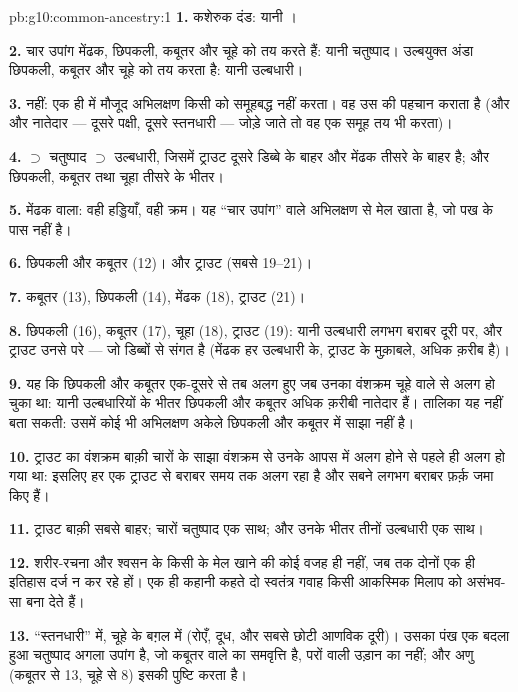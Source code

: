 \begin{solution}{pb:g10:common-ancestry:1}
\textbf{1.} कशेरुक दंड: यानी ।

\textbf{2.} चार उपांग मेंढक, छिपकली, कबूतर और चूहे को तय करते हैं: यानी
चतुष्पाद। उल्बयुक्त अंडा छिपकली, कबूतर और चूहे को तय करता है: यानी
उल्बधारी।

\textbf{3.} नहीं: एक ही  में मौजूद अभिलक्षण किसी को समूहबद्ध नहीं
करता। वह उस  की पहचान कराता है (और और नातेदार --- दूसरे पक्षी,
दूसरे स्तनधारी --- जोड़े जाते तो वह एक समूह तय भी करता)।

\textbf{4.}  $\supset$ चतुष्पाद $\supset$ उल्बधारी, जिसमें ट्राउट
दूसरे डिब्बे के बाहर और मेंढक तीसरे के बाहर है; और छिपकली, कबूतर तथा चूहा
तीसरे के भीतर।

\textbf{5.} मेंढक वाला: वही हड्डियाँ, वही क्रम। यह
``चार उपांग'' वाले अभिलक्षण से मेल खाता है, जो पख के पास नहीं है।

\textbf{6.} छिपकली और कबूतर (12)। और ट्राउट (सबसे 19--21)।

\textbf{7.} कबूतर (13), छिपकली (14), मेंढक (18), ट्राउट (21)।

\textbf{8.} छिपकली (16), कबूतर (17), चूहा (18), ट्राउट (19): यानी
उल्बधारी लगभग बराबर दूरी पर, और ट्राउट उनसे परे --- जो डिब्बों से संगत
है (मेंढक हर उल्बधारी के, ट्राउट के मुक़ाबले, अधिक क़रीब है)।

\textbf{9.} यह कि छिपकली और कबूतर एक-दूसरे से तब अलग हुए जब उनका
वंशक्रम चूहे वाले से अलग हो चुका था: यानी उल्बधारियों के भीतर छिपकली और
कबूतर अधिक क़रीबी नातेदार हैं। तालिका यह नहीं बता सकती: उसमें कोई भी
अभिलक्षण अकेले छिपकली और कबूतर में साझा नहीं है।

\textbf{10.} ट्राउट का वंशक्रम बाक़ी चारों के साझा वंशक्रम से उनके
आपस में अलग होने से पहले ही अलग हो गया था: इसलिए हर एक ट्राउट से बराबर
समय तक अलग रहा है और सबने लगभग बराबर फ़र्क़ जमा किए हैं।

\textbf{11.} ट्राउट बाक़ी सबसे बाहर; चारों चतुष्पाद एक साथ; और उनके भीतर
तीनों उल्बधारी एक साथ।

\textbf{12.} शरीर-रचना और श्वसन के किसी  के मेल खाने की कोई वजह
ही नहीं, जब तक दोनों एक ही इतिहास दर्ज न कर रहे हों। एक ही कहानी कहते दो
स्वतंत्र गवाह किसी आकस्मिक मिलाप को असंभव-सा बना देते हैं।

\textbf{13.} ``स्तनधारी'' में, चूहे के बग़ल में (रोएँ, दूध, और सबसे छोटी
आणविक दूरी)। उसका पंख एक बदला हुआ चतुष्पाद अगला उपांग है, जो कबूतर वाले
का समवृत्ति है, परों वाली उड़ान का  नहीं; और अणु (कबूतर से 13,
चूहे से 8) इसकी पुष्टि करता है।


\end{solution}
